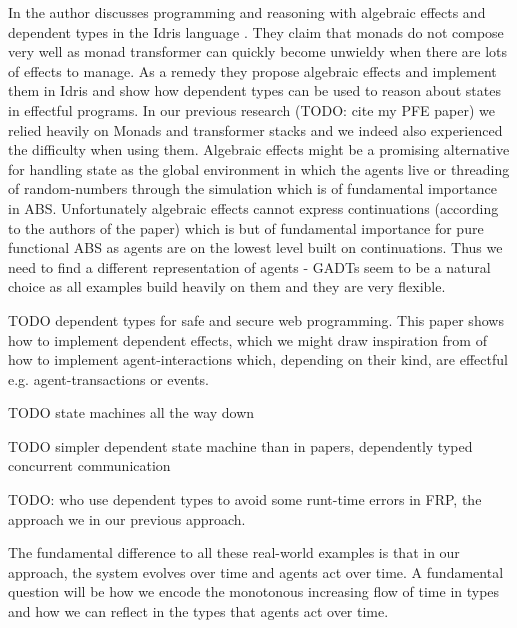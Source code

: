 In \cite{brady_programming_2013} the author discusses programming and reasoning with algebraic effects and dependent types in the Idris language \cite{brady_idris_2013}. They claim that monads do not compose very well as monad transformer can quickly become unwieldy when there are lots of effects to manage. As a remedy they propose algebraic effects and implement them in Idris and show how dependent types can be used to reason about states in effectful programs. In our previous research (TODO: cite my PFE paper) we relied heavily on Monads and transformer stacks and we indeed also experienced the difficulty when using them. Algebraic effects might be a promising alternative for handling state as the global environment in which the agents live or threading of random-numbers through the simulation which is of fundamental importance in ABS. Unfortunately algebraic effects cannot express continuations (according to the authors of the paper) which is but of fundamental importance for pure functional ABS as agents are on the lowest level built on continuations. Thus we need to find a different representation of agents - GADTs seem to be a natural choice as all examples build heavily on them and they are very flexible.

TODO \cite{fowler_dependent_2014} dependent types for safe and secure web programming. This paper shows how to implement dependent effects, which we might draw inspiration from of how to implement agent-interactions which, depending on their kind, are effectful e.g. agent-transactions or events.

TODO \cite{brady_state_2016} state machines all the way down

TODO \cite{brady_type-driven_2017} simpler dependent state machine than in papers, dependently typed concurrent communication

TODO: \cite{sculthorpe_safe_2009} who use dependent types to avoid some runt-time errors in FRP, the approach we in our previous approach.

The fundamental difference to all these real-world examples is that in our approach, the system evolves over time and agents act over time. A fundamental question will be how we encode the monotonous increasing flow of time in types and how we can reflect in the types that agents act over time.


